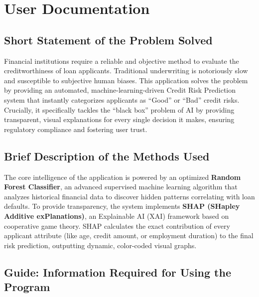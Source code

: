 \hypertarget{user-documentation}{%
\chapter{User Documentation}\label{user-documentation}}

\hypertarget{short-statement-of-the-problem-solved}{%
\section{Short Statement of the Problem
Solved}\label{short-statement-of-the-problem-solved}}

Financial institutions require a reliable and objective method to
evaluate the creditworthiness of loan applicants. Traditional
underwriting is notoriously slow and susceptible to subjective human
biases. This application solves the problem by providing an automated,
machine-learning-driven Credit Risk Prediction system that instantly
categorizes applicants as ``Good'' or ``Bad'' credit risks. Crucially,
it specifically tackles the ``black box'' problem of AI by providing
transparent, visual explanations for every single decision it makes,
ensuring regulatory compliance and fostering user trust.

\hypertarget{brief-description-of-the-methods-used}{%
\section{Brief Description of the Methods
Used}\label{brief-description-of-the-methods-used}}

The core intelligence of the application is powered by an optimized
\textbf{Random Forest Classifier}, an advanced supervised machine
learning algorithm that analyzes historical financial data to discover
hidden patterns correlating with loan defaults. To provide transparency,
the system implements \textbf{SHAP (SHapley Additive exPlanations)}, an
Explainable AI (XAI) framework based on cooperative game theory. SHAP
calculates the exact contribution of every applicant attribute (like
age, credit amount, or employment duration) to the final risk
prediction, outputting dynamic, color-coded visual graphs.

\hypertarget{guide-information-required-for-using-the-program}{%
\section{Guide: Information Required for Using the
Program}\label{guide-information-required-for-using-the-program}}

